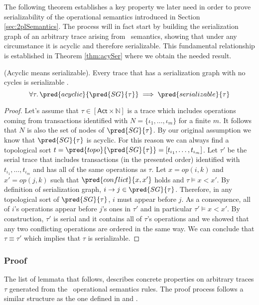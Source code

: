The following theorem establishes a key property we later need in order to prove serializability of the operational semantics introduced in Section \ref{sec:2plSemantics}. The process will in fact start by building the serialization graph of an arbitrary trace arising from \tpl\ semantics, showing that under any circumstance it is acyclic and therefore serializable. This fundamental relationship is established in Theorem \ref{thm:acySer} where we obtain the needed result.
\begin{thm}
	\label{thm:acySer}
	(Acyclic means serializable).
	Every trace that has a serialization graph with no cycles is serializable \cite{ccontrol}.
	\[
		\forall \tau \ldotp \pred{acyclic}{\pred{SG}{\tau}} \implies \pred{serializable}{\tau}
	\]
	
	\begin{proof}
	Let's assume that $\tau \in [\mathsf{Act} \times \mathds{N}]$ is a trace which includes operations coming from transactions identified with $N = \{ \iota_1, \ldots, \iota_m \}$ for a finite $m$. It follows that $N$ is also the set of nodes of $\pred{SG}{\tau}$. By our original assumption we know that $\pred{SG}{\tau}$ is acyclic. For this reason we can always find a topological sort $t = \pred{topo}{\pred{SG}{\tau}} = [t_{\iota_1}, \ldots, t_{\iota_m}]$. Let $\tau'$ be the serial trace that includes transactions (in the presented order) identified with $t_{\iota_1}, \ldots, t_{\iota_m}$ and has all of the same operations as $\tau$. Let $x = op(i, k)$ and $x' = op(j, k)$ such that $\pred{conflict}{x, x'}$ holds and $\tau \vDash x < x'$. By definition of serialization graph, $i \rightarrow j \in \pred{SG}{\tau}$. Therefore, in any topological sort of $\pred{SG}{\tau}$, $i$ must appear before $j$. As a consequence, all of $i$'s operations appear before $j$'s ones in $\tau'$ and in particular $\tau' \vDash x < x'$. By construction, $\tau'$ is serial and it contains all of $\tau$'s operations and we showed that any two conflicting operations are ordered in the same way. We can conclude that $\tau \equiv \tau'$ which implies that $\tau$ is serializable.
	\end{proof}
\end{thm}

\subsubsection{Proof}

The list of lemmata that follows, describes concrete properties on arbitrary traces $\tau$ generated from the \tpl\ operational semantics rules. The proof process follows a similar structure as the one defined in \cite{papa} and \cite{ccontrol}.

